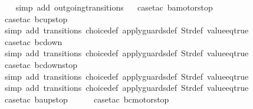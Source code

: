 \begin{isabellebody}
\ \ \isamarkupfalse%
\ {\isacharparenleft}simp\ add{\isacharcolon}\ outgoing{\isacharunderscore}transitions{\isacharunderscore}{}{\isacharparenright}\isanewline
\ \isamarkupfalse%
\ {\isacharparenleft}case{\isacharunderscore}tac\ {\isachardoublequoteopen}ba{\isacharequal}motorstop{}{\isachardoublequoteclose}{\isacharparenright}\isanewline
\ \ \ \ \isamarkupfalse%
\ {\isacharparenleft}case{\isacharunderscore}tac\ {\isachardoublequoteopen}bc{\isacharequal}up{}{}stop{\isachardoublequoteclose}{\isacharparenright}\isanewline
\ \ \ \ \ \isamarkupfalse%
\ {\isacharparenleft}simp\ add{\isacharcolon}\ transitions\ choice{\isacharunderscore}def\ apply{\isacharunderscore}guards{\isacharunderscore}def\ Str{\isacharunderscore}def\ value{\isacharunderscore}eq{\isacharunderscore}true{\isacharparenright}\isanewline
\ \ \ \ \isamarkupfalse%
\ {\isacharparenleft}case{\isacharunderscore}tac\ {\isachardoublequoteopen}bc{\isacharequal}down{}{}{\isachardoublequoteclose}{\isacharparenright}\isanewline
\ \ \ \ \ \isamarkupfalse%
\ {\isacharparenleft}simp\ add{\isacharcolon}\ transitions\ choice{\isacharunderscore}def\ apply{\isacharunderscore}guards{\isacharunderscore}def\ Str{\isacharunderscore}def\ value{\isacharunderscore}eq{\isacharunderscore}true{\isacharparenright}\isanewline
\ \ \ \ \isamarkupfalse%
\ {\isacharparenleft}case{\isacharunderscore}tac\ {\isachardoublequoteopen}bc{\isacharequal}down{}{}stop{\isachardoublequoteclose}{\isacharparenright}\isanewline
\ \ \ \ \ \isamarkupfalse%
\ {\isacharparenleft}simp\ add{\isacharcolon}\ transitions\ choice{\isacharunderscore}def\ apply{\isacharunderscore}guards{\isacharunderscore}def\ Str{\isacharunderscore}def\ value{\isacharunderscore}eq{\isacharunderscore}true{\isacharparenright}\isanewline
\ \ \ \ \isamarkupfalse%
\ {\isacharparenleft}simp\ add{\isacharcolon}\ transitions\ choice{\isacharunderscore}def\ apply{\isacharunderscore}guards{\isacharunderscore}def\ Str{\isacharunderscore}def\ value{\isacharunderscore}eq{\isacharunderscore}true{\isacharparenright}\isanewline
\ \isamarkupfalse%
\ {\isacharparenleft}case{\isacharunderscore}tac\ {\isachardoublequoteopen}ba{\isacharequal}up{}{}stop{\isachardoublequoteclose}{\isacharparenright}\isanewline
\ \ \ \ \isamarkupfalse%
\ {\isacharparenleft}case{\isacharunderscore}tac\ {\isachardoublequoteopen}bc{\isacharequal}motorstop{}{\isachardoublequoteclose}{\isacharparenright}\isanewline

\end{isabellebody}
